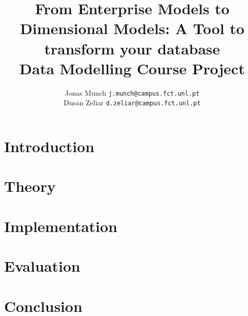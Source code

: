 \documentclass[a4paper, 10 pt, conference]{ieeeconf}
\title{\LARGE \bf
  From Enterprise Models to Dimensional Models: A Tool to transform your database \\
  Data Modelling Course Project
}
\author{
Jonas Munch {\tt\small j.munch@campus.fct.unl.pt} \\
Dusan Zeliar {\tt\small d.zeliar@campus.fct.unl.pt}
}
\begin{document}
\maketitle
\thispagestyle{empty}
\pagestyle{empty}



\begin{abstract}

\end{abstract}


\section{Introduction}
\label{sec:introduction}


\section{Theory}
\label{sec:theory}


\section{Implementation}
\label{sec:implementation}


\section{Evaluation}
\label{sec:evaluation}


\section{Conclusion}
\label{sec:conclusion}


%

\addtolength{\textheight}{0cm}   %




\end{document}
